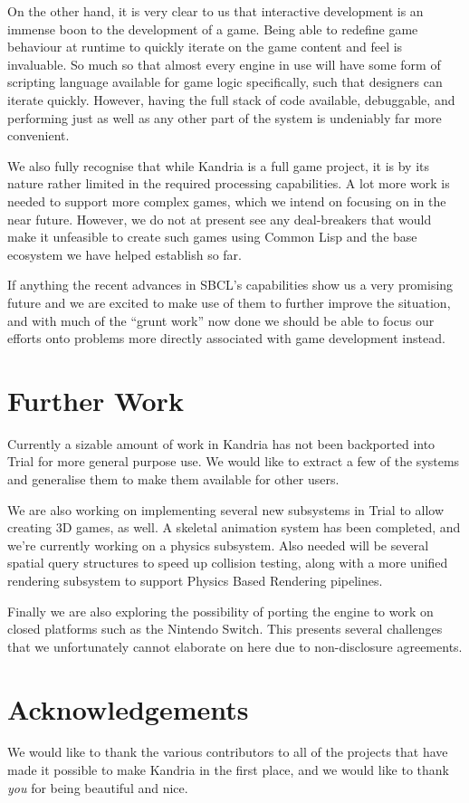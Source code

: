 \documentclass[format=sigconf]{acmart}
\begin{document}
On the other hand, it is very clear to us that interactive development is an immense boon to the development of a game. Being able to redefine game behaviour at runtime to quickly iterate on the game content and feel is invaluable. So much so that almost every engine in use will have some form of scripting language available for game logic specifically, such that designers can iterate quickly. However, having the full stack of code available, debuggable, and performing just as well as any other part of the system is undeniably far more convenient.

We also fully recognise that while Kandria is a full game project, it is by its nature rather limited in the required processing capabilities. A lot more work is needed to support more complex games, which we intend on focusing on in the near future. However, we do not at present see any deal-breakers that would make it unfeasible to create such games using Common Lisp and the base ecosystem we have helped establish so far.

If anything the recent advances in SBCL's capabilities show us a very promising future and we are excited to make use of them to further improve the situation, and with much of the ``grunt work'' now done we should be able to focus our efforts onto problems more directly associated with game development instead.

\section{Further Work}\label{further-work}
Currently a sizable amount of work in Kandria has not been backported into Trial for more general purpose use. We would like to extract a few of the systems and generalise them to make them available for other users.

We are also working on implementing several new subsystems in Trial to allow creating 3D games, as well. A skeletal animation system has been completed, and we're currently working on a physics subsystem. Also needed will be several spatial query structures to speed up collision testing, along with a more unified rendering subsystem to support Physics Based Rendering pipelines.

Finally we are also exploring the possibility of porting the engine to work on closed platforms such as the Nintendo Switch. This presents several challenges that we unfortunately cannot elaborate on here due to non-disclosure agreements.

\section{Acknowledgements}\label{acknowledgements}
We would like to thank the various contributors to all of the projects that have made it possible to make Kandria in the first place, and we would like to thank \textit{you} for being beautiful and nice.
\end{document}
